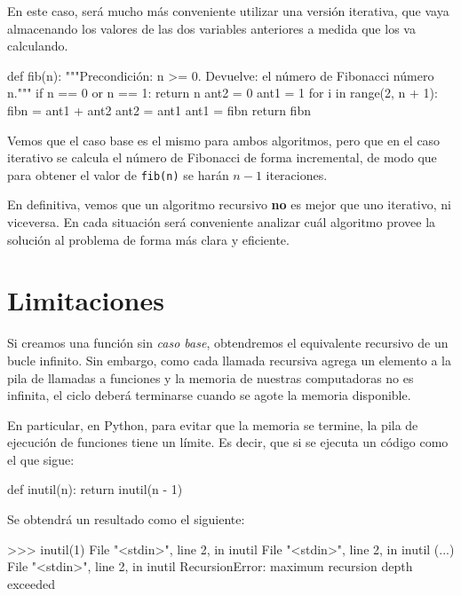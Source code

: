 En este caso, será mucho más conveniente utilizar una versión iterativa,
que vaya almacenando los valores de las dos variables anteriores a medida
que los va calculando.

\begin{codigo-python-sn}
def fib(n):
    """Precondición: n >= 0.
       Devuelve: el número de Fibonacci número n."""
    if n == 0 or n == 1:
        return n
    ant2 = 0
    ant1 = 1
    for i in range(2, n + 1):
        fibn = ant1 + ant2
        ant2 = ant1
        ant1 = fibn
    return fibn
\end{codigo-python-sn}

Vemos que el caso base es el mismo para ambos algoritmos, pero que en el
caso iterativo se calcula el número de Fibonacci de forma incremental, de
modo que para obtener el valor de \lstinline!fib(n)! se harán $n-1$
iteraciones.

\begin{atencion}
En definitiva, vemos que un algoritmo recursivo {\bf no} es mejor que uno
iterativo, ni viceversa.  En cada situación será conveniente analizar cuál
algoritmo provee la solución al problema de forma más clara y eficiente.
\end{atencion}

\section{Limitaciones}

Si creamos una función sin {\it caso base}, obtendremos el equivalente
recursivo de un bucle infinito.  Sin embargo, como cada llamada recursiva
agrega un elemento a la pila de llamadas a funciones y la memoria de
nuestras computadoras no es infinita, el ciclo deberá terminarse cuando se
agote la memoria disponible.

En particular, en Python, para evitar que la memoria se termine, la pila de
ejecución de funciones tiene un límite. Es decir, que si se ejecuta un
código como el que sigue:

\begin{codigo-python-sn}
def inutil(n):
    return inutil(n - 1)
\end{codigo-python-sn}

Se obtendrá un resultado como el siguiente:

\begin{codigo-python-sn}
>>> inutil(1)
  File "<stdin>", line 2, in inutil
  File "<stdin>", line 2, in inutil
  (...)
  File "<stdin>", line 2, in inutil
RecursionError: maximum recursion depth exceeded
\end{codigo-python-sn}

